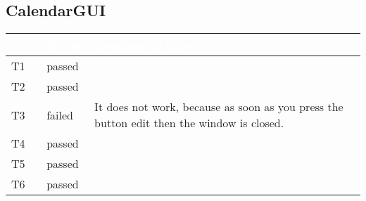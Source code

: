 \documentclass[12pt]{scrartcl}
\begin{document}
    \subsection{CalendarGUI}
        \begin{tabular}{|L{2cm}|L{1.2cm}|L{11cm}|} 
            \hline 
            \textcolor{white}{Test} & \textcolor{white}{Result} & \textcolor{white}{Comment if failed} \\ \hline
            T1 &  passed & \\  \hline
            T2 &  passed & \\  \hline
            T3 &  failed & It does not work, because as soon as you press the button edit then the window is closed. \\  \hline
            T4 &  passed & \\  \hline
            T5 &  passed & \\  \hline
            T6 &  passed & \\  \hline
        \end{tabular}
\end{document}
